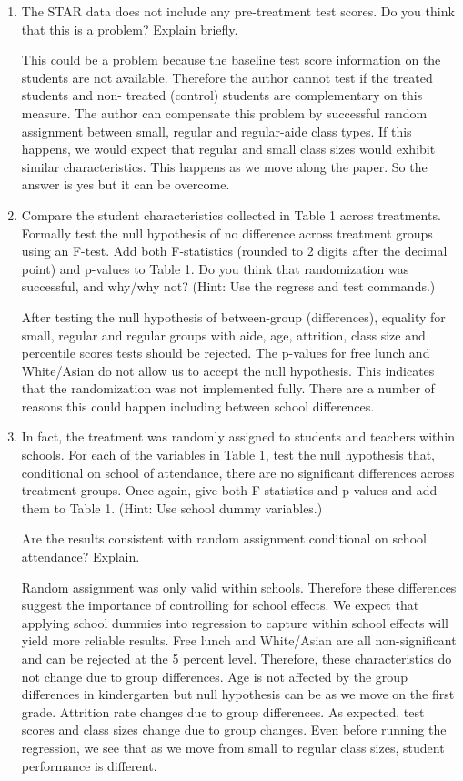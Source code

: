 \documentclass{article}
\begin{document}
\begin{enumerate}[label=\alph*]

\item  The STAR data does not include any pre-treatment test scores. Do you think that this is a problem? Explain briefly.

This could be a problem because the baseline test score information on the students are not available. Therefore the author cannot test if the treated students and non- treated (control) students are complementary on this measure. The author can compensate this problem by successful random assignment between small, regular and regular-aide class types. If this happens, we would expect that regular and small class sizes would exhibit similar characteristics.  This happens as we move along the paper. So the answer is yes but it can be overcome.

\item  Compare the student characteristics collected in Table 1 across treatments. Formally test the null hypothesis of no difference across treatment groups using an F-test. Add both F-statistics (rounded to 2 digits after the decimal point) and p-values to Table 1. Do you think that randomization was successful, and why/why not? (Hint: Use the regress and test commands.)

After testing the null hypothesis of between-group (differences), equality for small, regular and regular groups with aide, age, attrition, class size and percentile scores tests should be rejected. The p-values for free lunch and White/Asian do not allow us to accept the null hypothesis. This indicates that the randomization was not implemented fully.  There are a number of reasons this could happen including between school differences.

\item  In fact, the treatment was randomly assigned to students and teachers within schools. For each of the variables in Table 1, test the null hypothesis that, conditional on school of attendance, there are no significant differences across treatment groups. Once again, give both F-statistics and p-values and add them to Table 1. (Hint: Use school dummy variables.) 

Are the results consistent with random assignment conditional on school attendance? Explain.

Random assignment was only valid within schools. Therefore these differences suggest the importance of controlling for school effects. We expect that applying school dummies into regression to capture within school effects will yield more reliable results. Free lunch and White/Asian are all non-significant and can be rejected at the 5 percent level. Therefore, these characteristics do not change due to group differences. Age is not affected by the group differences in kindergarten but null hypothesis can be  as we move on the first grade. Attrition rate changes due to group differences. As expected, test scores and class sizes change due to group changes. Even before running the regression, we see that as we move from small to regular class sizes, student performance is different.

\end{enumerate}
\end{document}
